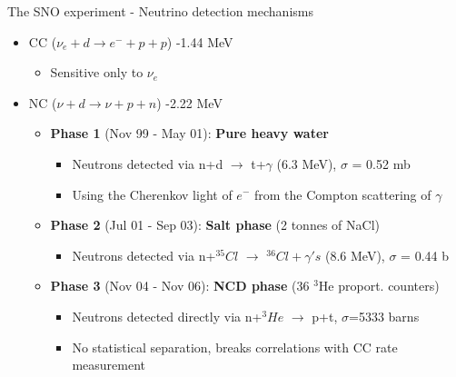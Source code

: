 \begin{frame}[t]{The SNO experiment - Neutrino detection mechanisms}

\begin{itemize}
  \item CC ({\color{red}$\nu_{e}+d \rightarrow e^{-}+p+p$}) -1.44 MeV
     \begin{itemize}
          \item Sensitive only to $\nu_{e}$
     \end{itemize}
  \item NC ({\color{blue}$\nu+d \rightarrow \nu+p+n$}) -2.22 MeV
     \begin{itemize}
          \item {\bf Phase 1} (Nov 99 - May 01): {\bf Pure heavy water}\\
                   \begin{itemize}
                      \item Neutrons detected via {\color{orange}n+d $\rightarrow$ t+$\gamma$} (6.3 MeV),
                            $\sigma$ = 0.52 mb
                      \item Using the Cherenkov light of $e^{-}$ from the Compton scattering of $\gamma$
                   \end{itemize}
          \item {\bf Phase 2} (Jul 01 - Sep 03): {\bf Salt phase} (2 tonnes of NaCl)\\
                   \begin{itemize}
                      \item Neutrons detected via
                            {\color{orange}n+$^{35}Cl$ $\rightarrow$ $^{36}Cl+\gamma's$} (8.6 MeV),
                            $\sigma$ = 0.44 b
                   \end{itemize}
          \item {\bf Phase 3} (Nov 04 - Nov 06): {\bf NCD phase} (36 $^{3}$He proport. counters)\\
                   \begin{itemize}
                      \item Neutrons detected directly via
                            {\color{orange}n+$^{3}He$ $\rightarrow$ p+t}, $\sigma$=5333 barns
                      \item No statistical separation, breaks correlations with CC rate measurement

\end{itemize}
\end{itemize}
\end{itemize}
\end{frame}
